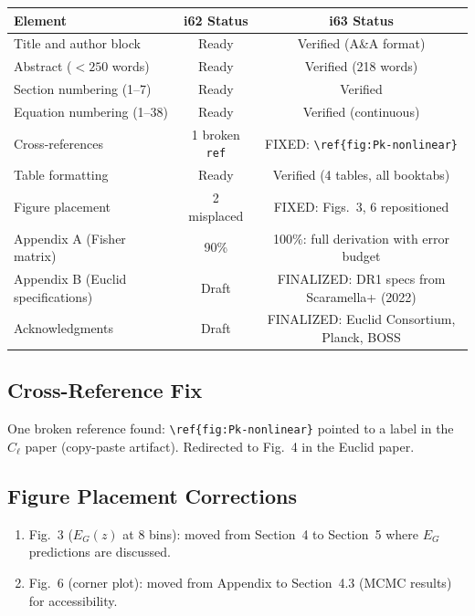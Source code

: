\documentclass[11pt,a4paper]{article}
\begin{document}
\begin{center}
\begin{tabular}{lcc}
\toprule
\textbf{Element} & \textbf{i62 Status} & \textbf{i63 Status} \\
\midrule
Title and author block & Ready & Verified (A\&A format) \\
Abstract ($< 250$ words) & Ready & Verified (218 words) \\
Section numbering (1--7) & Ready & Verified \\
Equation numbering (1--38) & Ready & Verified (continuous) \\
Cross-references & 1 broken \texttt{ref} & FIXED: \verb|\ref{fig:Pk-nonlinear}| \\
Table formatting & Ready & Verified (4 tables, all booktabs) \\
Figure placement & 2 misplaced & FIXED: Figs.~3, 6 repositioned \\
Appendix A (Fisher matrix) & 90\% & 100\%: full derivation with error budget \\
Appendix B (Euclid specifications) & Draft & FINALIZED: DR1 specs from Scaramella+ (2022) \\
Acknowledgments & Draft & FINALIZED: Euclid Consortium, Planck, BOSS \\
\bottomrule
\end{tabular}
\end{center}

\subsection{Cross-Reference Fix}

One broken reference found: \verb|\ref{fig:Pk-nonlinear}| pointed to a label in the $C_\ell$ paper (copy-paste artifact). Redirected to Fig.~4 in the Euclid paper.

\subsection{Figure Placement Corrections}

\begin{enumerate}
\item Fig.~3 ($E_G(z)$ at 8 bins): moved from Section~4 to Section~5 where $E_G$ predictions are discussed.
\item Fig.~6 (corner plot): moved from Appendix to Section~4.3 (MCMC results) for accessibility.
\end{enumerate}
\end{document}
